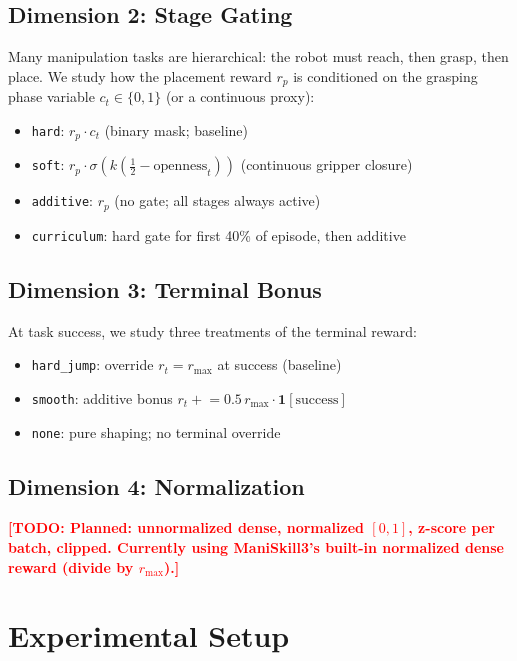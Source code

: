 \documentclass{article}
\newcommand{\todo}[1]{\textcolor{red}{\textbf{[TODO: #1]}}}
\begin{document}
\subsection{Dimension 2: Stage Gating}

Many manipulation tasks are hierarchical: the robot must reach, then grasp, then place.
We study how the placement reward $r_p$ is conditioned on the grasping phase variable
$c_t \in \{0,1\}$ (or a continuous proxy):

\begin{itemize}
    \item \texttt{hard}: $r_p \cdot c_t$ \quad (binary mask; baseline)
    \item \texttt{soft}: $r_p \cdot \sigma(k(\tfrac{1}{2} - \text{openness}_t))$
    \quad (continuous gripper closure)
    \item \texttt{additive}: $r_p$ \quad (no gate; all stages always active)
    \item \texttt{curriculum}: hard gate for first 40\% of episode, then additive
\end{itemize}

\subsection{Dimension 3: Terminal Bonus}

At task success, we study three treatments of the terminal reward:
\begin{itemize}
    \item \texttt{hard\_jump}: override $r_t = r_{\max}$ at success (baseline)
    \item \texttt{smooth}: additive bonus $r_t \mathrel{+}= 0.5\, r_{\max} \cdot \mathbf{1}[\text{success}]$
    \item \texttt{none}: pure shaping; no terminal override
\end{itemize}

\subsection{Dimension 4: Normalization}
\label{sec:norm}

\todo{Planned: unnormalized dense, normalized $[0,1]$, z-score per batch, clipped.
Currently using ManiSkill3's built-in normalized dense reward (divide by $r_{\max}$).}

\section{Experimental Setup}
\label{sec:setup}
\end{document}
